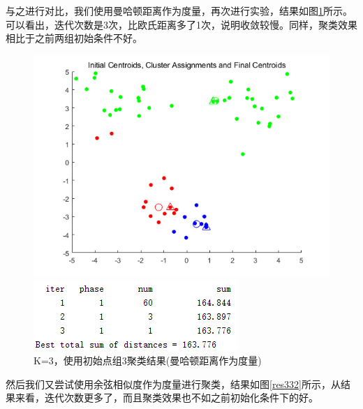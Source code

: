\documentclass[cn]{elegantbook}
\begin{document}
与之进行对比，我们使用曼哈顿距离作为度量，再次进行实验，结果如图\ref{res331}所示。可以看出，迭代次数是3次，比欧氏距离多了1次，说明收敛较慢。同样，聚类效果相比于之前两组初始条件不好。
\begin{figure}[!h]
	\centering
	\begin{minipage}{0.48\linewidth}
		\centering
		\includegraphics[width=\linewidth]{images/res332}
	\end{minipage}
	\begin{minipage}{0.48\linewidth}
		\centering
		\includegraphics[width=\linewidth]{images/res333}
	\end{minipage}
	\caption{\label{res331}K=3，使用初始点组3聚类结果(曼哈顿距离作为度量)}
\end{figure}

然后我们又尝试使用余弦相似度作为度量进行聚类，结果如图\ref{res332}所示，从结果来看，迭代次数更多了，而且聚类效果也不如之前初始化条件下的好。
\end{document}
